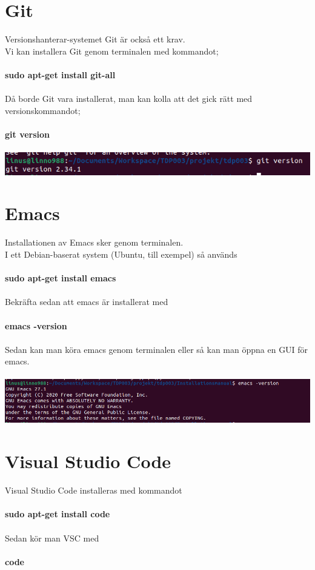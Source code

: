 \documentclass{TDP003mall}
\begin{document}
\section{Git}
Versionshanterar-systemet Git är också ett krav.\\ 
Vi kan installera Git genom terminalen med kommandot;\\\\
\textbf{sudo apt-get install git-all}\\\\
Då borde Git vara installerat, man kan kolla att det gick rätt med versionskommandot;\\\\
\textbf{git version}\\\\
\includegraphics[scale=0.5]{git_version}

\section{Emacs}
Installationen av Emacs sker genom terminalen.\\
I ett Debian-baserat system (Ubuntu, till exempel) så används\\\\
\textbf{sudo apt-get install emacs}\\\\
Bekräfta sedan att emacs är installerat med\\\\
\textbf{emacs -version}\\\\
Sedan kan man köra emacs genom terminalen eller så kan man öppna en GUI för emacs.\\\\
\includegraphics[scale=0.5]{emacs_version}


\section{Visual Studio Code}
Visual Studio Code installeras med kommandot\\\\
\textbf{sudo apt-get install code}\\\\ 
Sedan kör man VSC med\\\\
\textbf{code}
\end{document}
